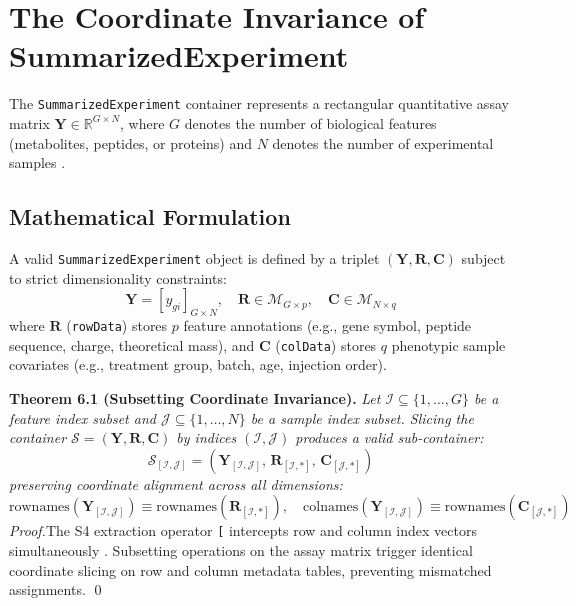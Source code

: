 \documentclass[11pt,twoside,openright]{book}
\begin{document}
\section{The Coordinate Invariance of SummarizedExperiment}
\label{sec:summarized_experiment_invariance}

The \texttt{SummarizedExperiment} container represents a rectangular quantitative assay matrix $\mathbf{Y} \in \mathbb{R}^{G \times N}$, where $G$ denotes the number of biological features (metabolites, peptides, or proteins) and $N$ denotes the number of experimental samples \cite{huber2015orchestrating}.

\subsection{Mathematical Formulation}

A valid \texttt{SummarizedExperiment} object is defined by a triplet $(\mathbf{Y}, \mathbf{R}, \mathbf{C})$ subject to strict dimensionality constraints:
\begin{equation}
\mathbf{Y} = [y_{gi}]_{G \times N}, \quad \mathbf{R} \in \mathcal{M}_{G \times p}, \quad \mathbf{C} \in \mathcal{M}_{N \times q}
\end{equation}
where $\mathbf{R}$ (\texttt{rowData}) stores $p$ feature annotations (e.g., gene symbol, peptide sequence, charge, theoretical mass), and $\mathbf{C}$ (\texttt{colData}) stores $q$ phenotypic sample covariates (e.g., treatment group, batch, age, injection order).

\noindent\textbf{Theorem 6.1 (Subsetting Coordinate Invariance).}\enspace
\textit{Let $\mathcal{I} \subseteq \{1, \dots, G\}$ be a feature index subset and $\mathcal{J} \subseteq \{1, \dots, N\}$ be a sample index subset. Slicing the container $\mathcal{S} = (\mathbf{Y}, \mathbf{R}, \mathbf{C})$ by indices $(\mathcal{I}, \mathcal{J})$ produces a valid sub-container:
\begin{equation}
\mathcal{S}_{[\mathcal{I}, \mathcal{J}]} = \left( \mathbf{Y}_{[\mathcal{I}, \mathcal{J}]}, \, \mathbf{R}_{[\mathcal{I}, *]}, \, \mathbf{C}_{[\mathcal{J}, *]} \right)
\end{equation}
preserving coordinate alignment across all dimensions:
\begin{equation}
\text{rownames}(\mathbf{Y}_{[\mathcal{I}, \mathcal{J}]}) \equiv \text{rownames}(\mathbf{R}_{[\mathcal{I}, *]}), \quad \text{colnames}(\mathbf{Y}_{[\mathcal{I}, \mathcal{J}]}) \equiv \text{rownames}(\mathbf{C}_{[\mathcal{J}, *]})
\end{equation}
Proof.}\enspace The S4 extraction operator \texttt{[} intercepts row and column index vectors simultaneously \cite{chambers2008software}. Subsetting operations on the assay matrix trigger identical coordinate slicing on row and column metadata tables, preventing mismatched assignments. \qed
\end{document}
